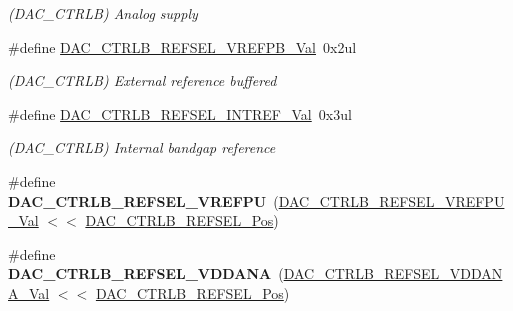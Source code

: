 \begin{DoxyCompactItemize}
\begin{DoxyCompactList}\small\item\em (D\+A\+C\+\_\+\+C\+T\+R\+L\+B) Analog supply \end{DoxyCompactList}\item 
\hypertarget{group___s_a_m_l21___d_a_c_gaf0266310f4ffdab4a62aed8023e5507c}{}\#define \hyperlink{group___s_a_m_l21___d_a_c_gaf0266310f4ffdab4a62aed8023e5507c}{D\+A\+C\+\_\+\+C\+T\+R\+L\+B\+\_\+\+R\+E\+F\+S\+E\+L\+\_\+\+V\+R\+E\+F\+P\+B\+\_\+\+Val}~0x2ul\label{group___s_a_m_l21___d_a_c_gaf0266310f4ffdab4a62aed8023e5507c}

\begin{DoxyCompactList}\small\item\em (D\+A\+C\+\_\+\+C\+T\+R\+L\+B) External reference buffered \end{DoxyCompactList}\item 
\hypertarget{group___s_a_m_l21___d_a_c_ga23d7b33954fbff27f8d3dcdcf389c185}{}\#define \hyperlink{group___s_a_m_l21___d_a_c_ga23d7b33954fbff27f8d3dcdcf389c185}{D\+A\+C\+\_\+\+C\+T\+R\+L\+B\+\_\+\+R\+E\+F\+S\+E\+L\+\_\+\+I\+N\+T\+R\+E\+F\+\_\+\+Val}~0x3ul\label{group___s_a_m_l21___d_a_c_ga23d7b33954fbff27f8d3dcdcf389c185}

\begin{DoxyCompactList}\small\item\em (D\+A\+C\+\_\+\+C\+T\+R\+L\+B) Internal bandgap reference \end{DoxyCompactList}\item 
\hypertarget{group___s_a_m_l21___d_a_c_gaef02c21f93e4fae94b1c888a61309666}{}\#define {\bfseries D\+A\+C\+\_\+\+C\+T\+R\+L\+B\+\_\+\+R\+E\+F\+S\+E\+L\+\_\+\+V\+R\+E\+F\+P\+U}~(\hyperlink{group___s_a_m_l21___d_a_c_ga1fa8cea85f63628846fe1cffd66ce84d}{D\+A\+C\+\_\+\+C\+T\+R\+L\+B\+\_\+\+R\+E\+F\+S\+E\+L\+\_\+\+V\+R\+E\+F\+P\+U\+\_\+\+Val}   $<$$<$ \hyperlink{group___s_a_m_l21___d_a_c_gace1da3ee1cda6efe12a220080a718b99}{D\+A\+C\+\_\+\+C\+T\+R\+L\+B\+\_\+\+R\+E\+F\+S\+E\+L\+\_\+\+Pos})\label{group___s_a_m_l21___d_a_c_gaef02c21f93e4fae94b1c888a61309666}

\item 
\hypertarget{group___s_a_m_l21___d_a_c_gace95cc93c9a20d42d81460f53b69d380}{}\#define {\bfseries D\+A\+C\+\_\+\+C\+T\+R\+L\+B\+\_\+\+R\+E\+F\+S\+E\+L\+\_\+\+V\+D\+D\+A\+N\+A}~(\hyperlink{group___s_a_m_l21___d_a_c_gae326fd37097c45092004ad8658ef7e64}{D\+A\+C\+\_\+\+C\+T\+R\+L\+B\+\_\+\+R\+E\+F\+S\+E\+L\+\_\+\+V\+D\+D\+A\+N\+A\+\_\+\+Val}   $<$$<$ \hyperlink{group___s_a_m_l21___d_a_c_gace1da3ee1cda6efe12a220080a718b99}{D\+A\+C\+\_\+\+C\+T\+R\+L\+B\+\_\+\+R\+E\+F\+S\+E\+L\+\_\+\+Pos})\label{group___s_a_m_l21___d_a_c_gace95cc93c9a20d42d81460f53b69d380}


\end{DoxyCompactItemize}
